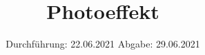

\subject{V500}
\title{Photoeffekt}
\date{%
  Durchführung: 22.06.2021
  \hspace{3em}
  Abgabe: 29.06.2021
}



\maketitle
\thispagestyle{empty}
\tableofcontents
\newpage






\printbibliography{}


